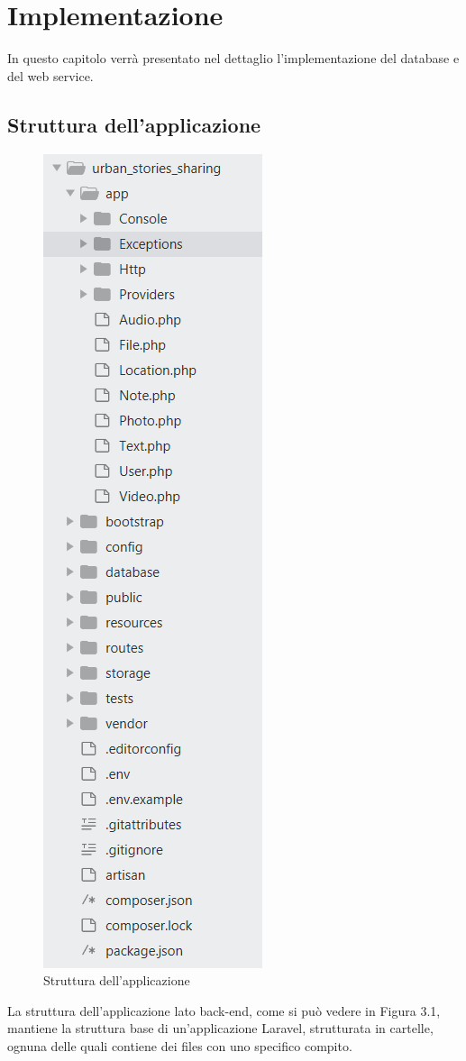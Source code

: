 \chapter{Implementazione}

In questo capitolo verrà presentato nel dettaglio l'implementazione del database e del web service.

\section{Struttura dell'applicazione}

\begin{figure}[H]
	\centering
	\includegraphics[width=0.3\linewidth, height=0.4\textheight]{Struttura_applicazione}
	\caption{Struttura dell'applicazione}
	\label{fig:Strutturaapplicazione}
\end{figure}


La struttura dell'applicazione lato back-end, come si può vedere in Figura 3.1, mantiene la struttura base di un'applicazione Laravel, strutturata in cartelle, ognuna delle quali contiene dei files con uno specifico compito.

